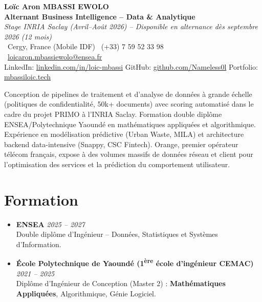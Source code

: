 \documentclass[a4paper,11pt]{article}
\begin{document}
\begin{center}
    {\Large \textbf{Lo\"ic Aron MBASSI EWOLO}} \\ \vspace{4pt}
    \textbf{\large Alternant Business Intelligence -- Data \& Analytique} \\
    \textit{\small Stage INRIA Saclay (Avril--Ao\^ut 2026) -- Disponible en alternance d\`es septembre 2026 (12 mois)} \\ \vspace{4pt}
    \small
    \Pointinghand\ Cergy, France (Mobile IDF) \quad \Mobilefone\ (+33) 7 59 52 33 98 \quad
    {\color{primary}\Letter\ \href{mailto:loicaron.mbassiewolo@ensea.fr}{loicaron.mbassiewolo@ensea.fr}} \\ \vspace{2pt}
    {\color{primary}LinkedIn: \href{https://www.linkedin.com/in/loic-mbassi/}{linkedin.com/in/loic-mbassi}} \quad
    {\color{primary}GitHub: \href{https://github.com/Nameless0l}{github.com/Nameless0l}} \quad
    {\color{primary}Portfolio: \href{https://mbassiloic.tech}{mbassiloic.tech}}
\end{center}
\vspace{-6pt}
\noindent\small{Conception de pipelines de traitement et d'analyse de donn\'ees \`a grande \'echelle (politiques de confidentialit\'e, 50k+ documents) avec scoring automatis\'e dans le cadre du projet PRIMO \`a l'INRIA Saclay. Formation double dipl\^ome ENSEA/Polytechnique Yaound\'e en math\'ematiques appliqu\'ees et algorithmique. Exp\'erience en mod\'elisation pr\'edictive (Urban Waste, MILA) et architecture backend data-intensive (Snappy, CSC Fintech). Orange, premier op\'erateur t\'el\'ecom fran\c{c}ais, expose \`a des volumes massifs de donn\'ees r\'eseau et client pour l'optimisation des services et la pr\'ediction du comportement utilisateur.}

\section{Formation}
\begin{itemize}[leftmargin=*, label=\tiny$\bullet$, nosep]
    \item \textbf{ENSEA} \hfill \textit{2025 -- 2027} \\
    \small{Double dipl\^ome d'Ing\'enieur -- Donn\'ees, Statistiques et Syst\`emes d'Information.}
    \item \textbf{\'Ecole Polytechnique de Yaound\'e (1\textsuperscript{\`ere} \'ecole d'ing\'enieur CEMAC)} \hfill \textit{2021 -- 2025} \\
    \small{Dipl\^ome d'Ing\'enieur de Conception (Master 2) : \textbf{Math\'ematiques Appliqu\'ees}, Algorithmique, G\'enie Logiciel.}
\end{itemize}
\end{document}
